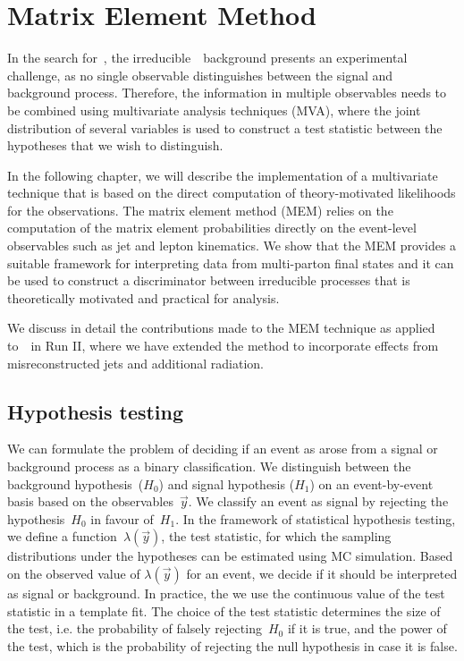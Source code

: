 \chapter{Matrix Element Method}
\label{sec:mem}
In the search for~\ttHbb, the irreducible~\ttbb~background presents an experimental challenge, as no single observable distinguishes between the signal and background process. Therefore, the information in multiple observables needs to be combined using multivariate analysis techniques (MVA), where the joint distribution of several variables is used to construct a test statistic between the hypotheses that we wish to distinguish.

In the following chapter, we will describe the implementation of a multivariate technique that is based on the direct computation of theory-motivated likelihoods for the observations. The matrix element method (MEM) relies on the computation of the matrix element probabilities directly on the event-level observables such as jet and lepton kinematics. We show that the MEM provides a suitable framework for interpreting data from multi-parton final states and it can be used to construct a discriminator between irreducible processes that is theoretically motivated and practical for analysis.

We discuss in detail the contributions made to the MEM technique as applied to~\ttHbb~in Run II, where we have extended the method to incorporate effects from misreconstructed jets and additional radiation. 

\section{Hypothesis testing}
\label{sec:test_statistic}
We can formulate the problem of deciding if an event as arose from a signal or background process as a binary classification. We distinguish between the background hypothesis~($H_0$) and signal hypothesis ($H_1$) on an event-by-event basis based on the observables~$\vec{y}$. We classify an event as signal by rejecting the hypothesis~$H_0$ in favour of~$H_1$. In the framework of statistical hypothesis testing, we define a function~$\lambda(\vec{y})$, the test statistic, for which the sampling distributions under the hypotheses can be estimated using MC simulation. Based on the observed value of $\lambda(\vec{y})$ for an event, we decide if it should be interpreted as signal or background. In practice, the we use the continuous value of the test statistic in a template fit. The choice of the test statistic determines the size of the test, i.e. the probability of falsely rejecting~$H_0$ if it is true, and the power of the test, which is the probability of rejecting the null hypothesis in case it is false.

